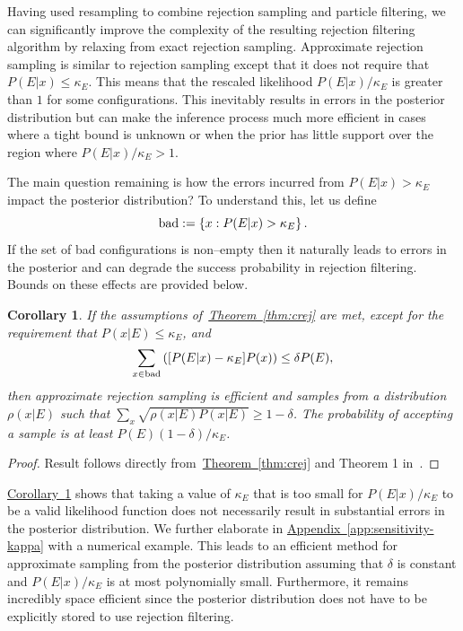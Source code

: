 \documentclass[twoside]{article}
\newtheorem{corollary}{Corollary}
\newcommand{\app}[1]{\hyperref[app:#1]{Appendix~\ref*{app:#1}}}
\newcommand{\thm}[1]{\hyperref[thm:#1]{Theorem~\ref*{thm:#1}}}
\newcommand{\cor}[1]{\hyperref[cor:#1]{Corollary~\ref*{cor:#1}}}
\begin{document}
Having used resampling to combine rejection sampling and particle filtering,
we can significantly improve the complexity of the resulting rejection filtering
algorithm by relaxing from exact rejection sampling.  Approximate rejection
sampling is similar to rejection sampling except
that it does not require that $P(E|x) \le \kappa_E$.  This means that the rescaled
likelihood $P(E|x)/\kappa_E$ is greater than $1$ for some
configurations.  This inevitably results in errors in the posterior distribution but can make the inference process much more efficient
in cases where a tight bound is unknown or when the prior has little support over the region where $P(E|x)/\kappa_E >1$.

The main question remaining is how  the
errors incurred from $P(E|x) > \kappa_E$ impact the posterior distribution?  To understand this, let us define
\begin{equation}
{\rm bad} := \left\{x: {P(E|x)} >{\kappa_E}\right\}.
\end{equation}
If the set of bad configurations is non--empty then it naturally leads to errors in the posterior and
can degrade the success probability in rejection filtering.  Bounds on these effects are
provided below.

\begin{corollary}\label{cor:badalgorithm}
If the assumptions of~\thm{crej} are met, except for the requirement that $P(x|E) \le \kappa_E$, and
$$\sum_{x\in {\rm bad}}  \left([P(E|x)-\kappa_E] P(x)\right) \le \delta P(E),$$
  then approximate rejection sampling is  efficient and samples from a distribution $\rho(x|E)$ such that ${\sum_x \sqrt{\rho(x|E) P(x|E)}} \ge 1-\delta$.
The probability of accepting a sample is at least ${P(E) (1-\delta)}/{\kappa_E}$.\label{thm:kappa}
\end{corollary}
\begin{proof}
Result follows directly from~\thm{crej} and Theorem 1 in~\cite{WKGS15}.
\end{proof}

\cor{badalgorithm} shows that taking a value of $\kappa_E$ that is too small for $P(E|x)/\kappa_E$ to be a valid likelihood function does not necessarily result in substantial errors in the posterior distribution.
We further elaborate in \app{sensitivity-kappa} with a numerical example.
This leads to an efficient method for approximate sampling from the posterior distribution assuming that $\delta$ is constant and $P(E|x)/\kappa_E$ is at most polynomially small.  Furthermore, it remains incredibly space efficient since the posterior distribution does not have to be explicitly stored to use rejection filtering.
\end{document}
